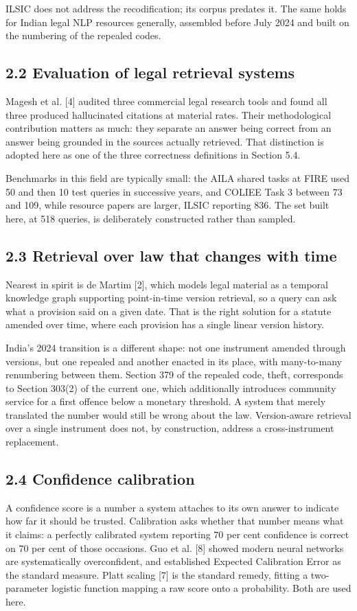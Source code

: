 \documentclass[12pt,a4paper]{article}
\begin{document}
ILSIC does not address the recodification; its corpus predates it. The same holds for Indian legal NLP resources generally, assembled before July 2024 and built on the numbering of the repealed codes.

\subsection*{2.2 Evaluation of legal retrieval systems}
Magesh et al. [4] audited three commercial legal research tools and found all three produced hallucinated citations at material rates. Their methodological contribution matters as much: they separate an answer being correct from an answer being grounded in the sources actually retrieved. That distinction is adopted here as one of the three correctness definitions in Section 5.4.

Benchmarks in this field are typically small: the AILA shared tasks at FIRE used 50 and then 10 test queries in successive years, and COLIEE Task 3 between 73 and 109, while resource papers are larger, ILSIC reporting 836. The set built here, at 518 queries, is deliberately constructed rather than sampled.

\subsection*{2.3 Retrieval over law that changes with time}
Nearest in spirit is de Martim [2], which models legal material as a temporal knowledge graph supporting point-in-time version retrieval, so a query can ask what a provision said on a given date. That is the right solution for a statute amended over time, where each provision has a single linear version history.

India's 2024 transition is a different shape: not one instrument amended through versions, but one repealed and another enacted in its place, with many-to-many renumbering between them. Section 379 of the repealed code, theft, corresponds to Section 303(2) of the current one, which additionally introduces community service for a first offence below a monetary threshold. A system that merely translated the number would still be wrong about the law. Version-aware retrieval over a single instrument does not, by construction, address a cross-instrument replacement.

\subsection*{2.4 Confidence calibration}
A confidence score is a number a system attaches to its own answer to indicate how far it should be trusted. Calibration asks whether that number means what it claims: a perfectly calibrated system reporting 70 per cent confidence is correct on 70 per cent of those occasions. Guo et al. [8] showed modern neural networks are systematically overconfident, and established Expected Calibration Error as the standard measure. Platt scaling [7] is the standard remedy, fitting a two-parameter logistic function mapping a raw score onto a probability. Both are used here.
\end{document}

